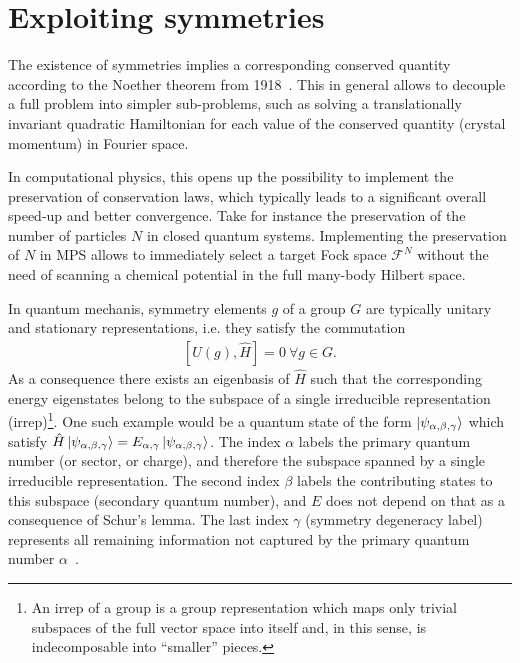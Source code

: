 \documentclass{svmono}
\def\FS{\mathcal{F}}
\newcommand{\commutator}[1]{\left[ #1 \right]}
\begin{document}
\section{Exploiting symmetries}
\label{sec:exploiting_symmetries}
The existence of symmetries implies a corresponding conserved quantity according to the Noether theorem from 1918~\cite{Noether1971}.
This in general allows to decouple a full problem into simpler sub-problems, such as solving a translationally invariant quadratic Hamiltonian for each value of the conserved quantity (crystal momentum) in Fourier space.

In computational physics, this opens up the possibility to implement the preservation of conservation laws, which typically leads to a significant overall speed-up and better convergence.
Take for instance the preservation of the number of particles $N$ in closed quantum systems.
Implementing the preservation of $N$ in MPS allows to immediately select a target Fock space $\FS^N$ without the need of scanning a chemical potential in the full many-body Hilbert space.

In quantum mechanis, symmetry elements $g$ of a group $G$ are typically unitary and stationary representations, i.e. they satisfy the commutation
\begin{align}
    \commutator{U(g),\hat H} = 0\ \forall g\in G.
\end{align}
As a consequence there exists an eigenbasis of $\hat H$ such that the corresponding energy eigenstates belong to the subspace of a single irreducible representation (irrep)\footnote{An irrep of a group is a group representation which maps only trivial subspaces of the full vector space into itself and, in this sense, is indecomposable into ``smaller'' pieces.}.
One such example would be a quantum state of the form $\ket{\psi_{\alpha,\beta,\gamma}}$ which satisfy $\hat H\ket{\psi_{\alpha,\beta,\gamma}} = E_{\alpha,\gamma}\ket{\psi_{\alpha,\beta,\gamma}}$.
The index $\alpha$ labels the primary quantum number (or sector, or charge), and therefore the subspace spanned by a single irreducible representation.
The second index $\beta$ labels the contributing states to this subspace (secondary quantum number), and $E$ does not depend on that as a consequence of Schur's lemma.
The last index $\gamma$ (symmetry degeneracy label) represents all remaining information not captured by the primary quantum number $\alpha$~\cite{Silvi2019}.
\end{document}
